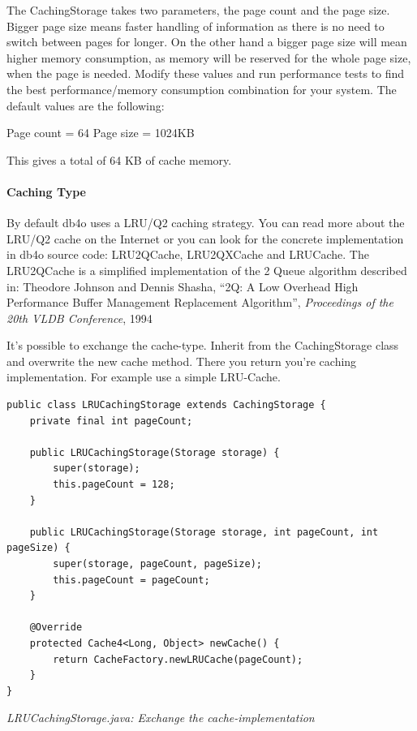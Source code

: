 The CachingStorage takes two parameters, the page count and the page size. Bigger page size means faster handling of information as there is no need to switch between pages for longer. On the other hand a bigger page size will mean higher memory consumption, as memory will be reserved for the whole page size, when the page is needed. Modify these values and run performance tests to find the best performance/memory consumption combination for your system. The default values are the following:

Page count = 64 Page size = 1024KB

This gives a total of 64 KB of cache memory.

\paragraph*{Caching Type}

By default db4o uses a LRU/Q2 caching strategy. You can read more about the LRU/Q2 cache on the Internet or you can look for the concrete implementation in db4o source code: LRU2QCache, LRU2QXCache and LRUCache. The LRU2QCache is a simplified implementation of the 2 Queue algorithm described in: Theodore Johnson and Dennis Shasha, ``2Q: A Low Overhead High Performance Buffer Management Replacement Algorithm'', \emph{Proceedings of the 20th VLDB Conference}, 1994

It's possible to exchange the cache-type. Inherit from the CachingStorage class and overwrite the new cache method. There you return you're caching implementation. For example use a simple LRU-Cache.

\begin{lstlisting}
public class LRUCachingStorage extends CachingStorage {
    private final int pageCount;

    public LRUCachingStorage(Storage storage) {
        super(storage);
        this.pageCount = 128;
    }

    public LRUCachingStorage(Storage storage, int pageCount, int pageSize) {
        super(storage, pageCount, pageSize);
        this.pageCount = pageCount;
    }

    @Override
    protected Cache4<Long, Object> newCache() {
        return CacheFactory.newLRUCache(pageCount);
    }
}
\end{lstlisting}

{\small\itshape LRUCachingStorage.java: Exchange the cache-implementation\par}
\medskip

